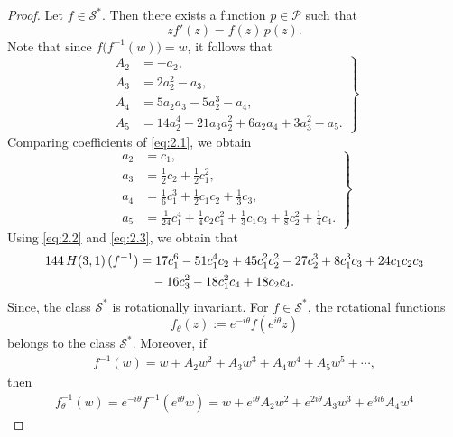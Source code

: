 \documentclass[10pt,a4paper]{amsart}
\begin{document}
	\begin{proof}
		Let $f \in \mathcal{S}^{*}$. Then there exists a function $p \in \mathcal{P}$ such that
		\begin{equation}\label{eq:2.1}
			z f'(z) = f(z)\,p(z).
		\end{equation}
		Note that since $f\bigl(f^{-1}(w)\bigr) = w$, it follows that
		\begin{equation}\label{eq:2.2}
			\left.
			\begin{aligned}
				A_2 &= -a_2,\\
				A_3 &= 2a_2^2 - a_3,\\
				A_4 &= 5 a_2 a_3 - 5 a_2^3 - a_4,\\
				A_5 &= 14 a_2^4 - 21 a_3 a_2^2 + 6 a_2 a_4 + 3 a_3^2 - a_5.
			\end{aligned}
			\right\}
		\end{equation}
		Comparing coefficients of \eqref{eq:2.1}, we obtain
		\begin{equation}\label{eq:2.3}
			\left.
			\begin{aligned}
				a_2 &= c_1,\\
				a_3 &= \frac{1}{2} c_2 + \frac{1}{2} c_1^2,\\
				a_4 &= \frac{1}{6} c_1^3 + \frac{1}{2} c_1 c_2 + \frac{1}{3} c_3,\\
				a_5 &= \frac{1}{24} c_1^4 + \frac{1}{4} c_2 c_1^2 + \frac{1}{3} c_1 c_3
				+ \frac{1}{8} c_2^2 + \frac{1}{4} c_4.
			\end{aligned}
			\right\}
		\end{equation}
		Using \eqref{eq:2.2} and \eqref{eq:2.3}, we obtain that
		\begin{align}\label{eq:2.4}
			144\, H(3,1)\,(f^{-1}) &=
			17 c_1^6 - 51 c_1^4 c_2 + 45 c_1^2 c_2^2 - 27 c_2^3
			+ 8 c_1^3 c_3 + 24 c_1 c_2 c_3\notag\\
			&\quad - 16 c_3^2
			- 18 c_1^2 c_4 + 18 c_2 c_4.
		\end{align}
		Since,  the class $\mathcal{S}^{*}$ is rotationally invariant. For $f \in \mathcal{S}^*$, the rotational functions 
		\[
		f_{\theta}(z):=e^{-i\theta}f(e^{i\theta}z)
		\]
		belongs to the class $\mathcal{S}^*.$ Moreover, if
		\begin{align*}
		f^{-1}(w)=w+A_{2}w^{2}+A_{3}w^{3}+A_{4}w^{4}+A_{5}w^{5}+\cdots,
		\end{align*}
		then
		\begin{align*}
		f_{\theta}^{-1}(w)=e^{-i\theta}f^{-1}(e^{i\theta}w)
		= w+e^{i\theta}A_{2}w^{2}+e^{2i\theta}A_{3}w^{3}+e^{3i\theta}A_{4}w^{4}

\end{align*}
\end{proof}
\end{document}
